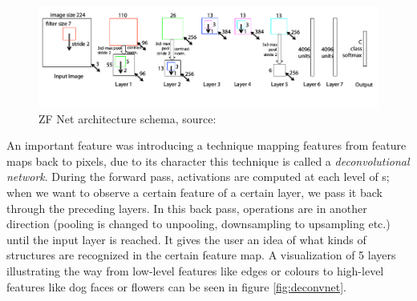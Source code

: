 \begin{figure}[H]
   \centering
	\includegraphics[width=\linewidth]{./pictures/zf-net.png}
	\caption[ZF Net architecture]{ZF Net architecture schema, source: 
\cite{zf-net}}
      \label{fig:zf-net}
\end{figure}

An important feature was introducing a technique mapping features from feature 
maps back to pixels, due to its character this technique is called a 
\textit{deconvolutional network}. During the forward pass, activations are 
computed at each level of s; when we want to observe a certain feature 
of a certain layer, we pass it back through the preceding layers. In this back 
pass, operations are in another direction (pooling is changed to unpooling, 
downsampling to upsampling etc.) until the input layer is reached. It gives the 
user an idea of what kinds of structures are recognized in the certain feature 
map. A visualization of 5 layers illustrating the way from low-level features 
like edges or colours to high-level features like dog faces or flowers can be 
seen in figure \ref{fig:deconvnet}.

